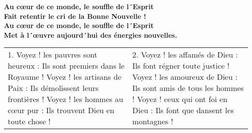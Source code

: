 \textbf{
Au cœur de ce monde, le souffle de l´Esprit\\
Fait retentir le cri de la Bonne Nouvelle !\\
Au cœur  de ce monde, le souffle de l´Esprit\\
Met à l´œuvre aujourd´hui des énergies nouvelles.
}

\begin{tabular}{p{} p{}}
1.
Voyez ! les pauvres sont heureux :\newline
Ils sont premiers dans le Royaume !\newline
Voyez ! les artisans de Paix :\newline
Ils démolissent leurs frontières !\newline
Voyez ! les hommes au cœur pur :\newline
Ils trouvent Dieu en toute chose !
&
2.
Voyez ! les affamés de Dieu :\newline
Ils font régner toute justice !\newline
Voyez ! les amoureux de Dieu :\newline
Ils sont amis de tous les hommes !\newline
Voyez ! ceux qui ont foi en Dieu :\newline
Ils font que dansent les montagnes !
\end{tabular}
